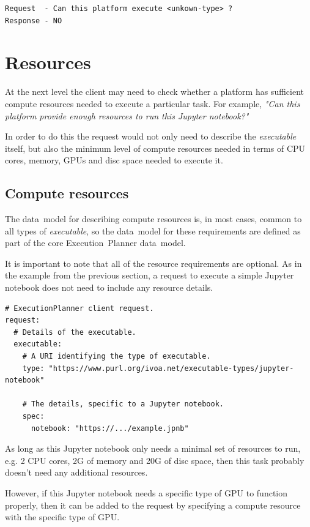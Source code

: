\documentclass[11pt,a4paper]{ivoa}
\newcommand{\datamodel} {data~model}
\newcommand{\executionplanner} {Execution~Planner}
\newcommand{\jupyternotebook} {Jupyter notebook}
\newcommand{\executable} {\textit{executable}}
\newcommand{\cpu} {CPU}
\newcommand{\gpu} {GPU}
\begin{document}
\begin{lstlisting}[]
Request  - Can this platform execute <unkown-type> ?
Response - NO
\end{lstlisting}

\section{Resources}
\label{resources}

At the next level the client may need to check whether a platform has sufficient compute resources
needed to execute a particular task.
For example, \textit{"Can this platform provide enough resources to run this \jupyternotebook{}?"}

In order to do this the request would not only need to describe the \executable{} itself,
but also the minimum level of compute resources needed in terms of \cpu{} cores, memory, \gpu{}s
and disc space needed to execute it.

\subsection{Compute resources}
\label{compute-resources}

The \datamodel{} for describing compute resources is, in most cases, common to all types of \executable{},
so the \datamodel{} for these requirements are defined as part of the core \executionplanner{} \datamodel{}.

It is important to note that all of the resource requirements are optional.
As in the example from the previous section, a request to execute a simple \jupyternotebook{}
does not need to include any resource details.

\begin{lstlisting}[]
# ExecutionPlanner client request.
request:
  # Details of the executable.
  executable:
    # A URI identifying the type of executable.
    type: "https://www.purl.org/ivoa.net/executable-types/jupyter-notebook"

    # The details, specific to a Jupyter notebook.
    spec:
      notebook: "https://.../example.jpnb"
\end{lstlisting}

As long as this \jupyternotebook{} only needs a minimal set of resources to run, e.g.
2 \cpu{} cores, 2G of memory and 20G of disc space, then this task probably doesn't need
any additional resources.

However, if this \jupyternotebook{} needs a specific type of \gpu{} to function properly,
then it can be added to the request by specifying a compute resource with the specific type
of \gpu{}.
\end{document}
